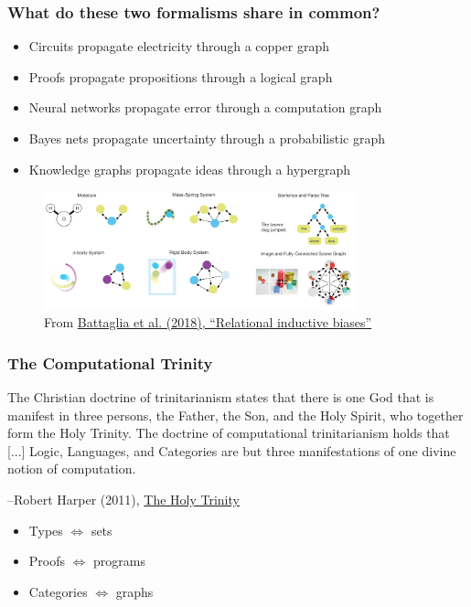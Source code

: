 \documentclass{beamer}
\begin{document}
\begin{frame}
  \frametitle{What do these two formalisms share in common?}
  \begin{itemize}
    \item Circuits propagate electricity through a copper graph
    \item Proofs propagate propositions through a logical graph
    \item Neural networks propagate error through a computation graph
    \item Bayes nets propagate uncertainty through a probabilistic graph
    \item Knowledge graphs propagate ideas through a hypergraph
  \end{itemize}
  \begin{figure}[H]
    \centering
    \includegraphics[width=0.8\textwidth]{../../clipart/relational_biases.png}
    \caption{From \href{https://arxiv.org/pdf/1806.01261.pdf}{Battaglia et al. (2018), ``Relational inductive biases''}}
  \end{figure}
\end{frame}


\begin{frame}
    \frametitle{The Computational Trinity}
    \setlength{\epigraphwidth}{0.72\textwidth}
    \epigraph{The Christian doctrine of trinitarianism states that there is one God that is manifest in three persons, the Father, the Son, and the Holy Spirit, who together form the Holy Trinity. The doctrine of computational trinitarianism holds that [...] Logic, Languages, and Categories are but three manifestations of one divine notion of computation.}{--Robert Harper (2011), \href{https://existentialtype.wordpress.com/2011/03/27/the-holy-trinity/}{The Holy Trinity}}
    \begin{itemize}
        \item Types $\Leftrightarrow$ sets
        \item Proofs $\Leftrightarrow$ programs
        \item Categories $\Leftrightarrow$ graphs
    \end{itemize}
\end{frame}
\end{document}
